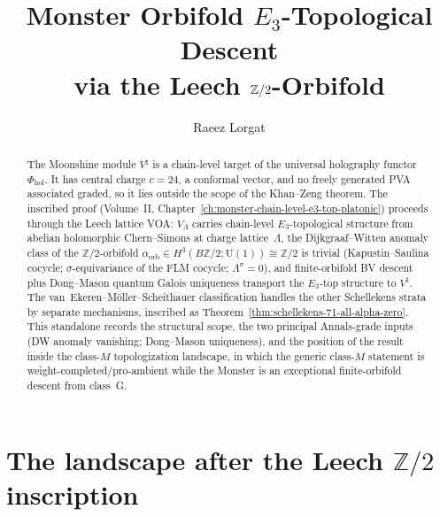 \documentclass[11pt]{amsart}
\title{Monster Orbifold $E_3$-Topological Descent\\
via the Leech $\Z/2$-Orbifold}
\author{Raeez Lorgat}
\theoremstyle{definition}
\theoremstyle{remark}
\providecommand{\Z}{\mathbb{Z}}
\begin{document}
\maketitle

\begin{abstract}
The Moonshine module $V^\natural$ is a chain-level target of the
universal holography functor~$\Phi_{\mathrm{hol}}$. It has central
charge $c = 24$, a conformal vector, and no freely generated PVA
associated graded, so it lies outside the scope of the
Khan--Zeng theorem. The inscribed proof (Volume~II,
Chapter~\ref*{ch:monster-chain-level-e3-top-platonic}) proceeds
through the Leech lattice VOA: $V_\Lambda$ carries chain-level
$E_3$-topological structure from abelian holomorphic Chern--Simons
at charge lattice~$\Lambda$, the Dijkgraaf--Witten anomaly class
of the $\Z/2$-orbifold $\alpha_{\mathrm{orb}} \in
H^3(B\Z/2;\mathrm{U}(1)) \cong \Z/2$ is trivial
(Kapustin--Saulina cocycle; $\sigma$-equivariance of the FLM
cocycle; $\Lambda^\sigma = 0$), and finite-orbifold BV descent plus
Dong--Mason quantum Galois uniqueness transport the $E_3$-top
structure to $V^\natural$. The van~Ekeren--M\"oller--Scheithauer
classification handles the other Schellekens strata by separate
mechanisms, inscribed as
Theorem~\ref*{thm:schellekens-71-all-alpha-zero}.
This standalone records the structural scope, the two principal
Annals-grade inputs (DW anomaly vanishing; Dong--Mason
uniqueness), and the position of the result inside the class-$M$
topologization landscape, in which the generic class-$M$ statement is
weight-completed/pro-ambient while the Monster is an exceptional
finite-orbifold descent from class~G.
\end{abstract}

\section{The landscape after the Leech $\Z/2$ inscription}
\end{document}
